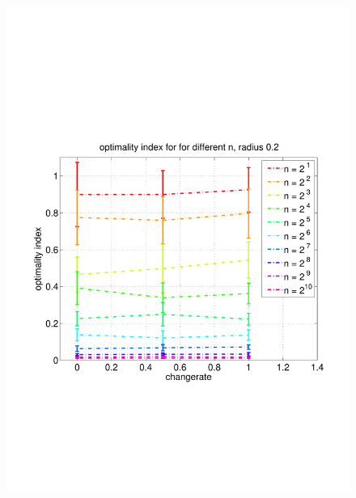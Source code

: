 \documentclass[11pt]{article}
\begin{document}
\begin{figure}
	\includegraphics[width=\linewidth]{../../code/data/2014_12_12_00_55_41/figure_8}
\end{figure}
\end{document}

